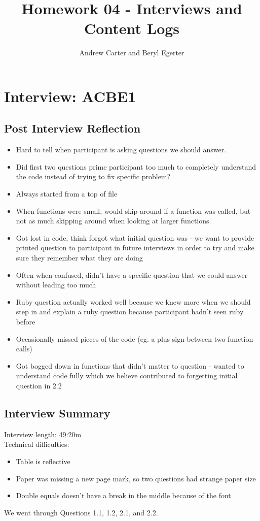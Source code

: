 \documentclass{article}
\title{Homework 04 - Interviews and Content Logs}
\author{Andrew Carter and Beryl Egerter}
\begin{document}
\maketitle
\section{Interview: ACBE1}
\subsection{Post Interview Reflection}
\begin{itemize}
  \item Hard to tell when participant is asking questions we should answer.
  \item Did first two questions prime participant too much to completely understand the code instead of trying to fix specific problem?
  \item Always started from a top of file
  \item When functions were small, would skip around if a function was called, but not as much skipping around when looking at larger functions.
  \item Got lost in code, think forgot what initial question was - we want to provide printed question to participant in future interviews in order to try and make sure they remember what they are doing
  \item Often when confused, didn't have a specific question that we could answer without leading too much
  \item Ruby question actually worked well because we knew more when we should step in and explain a ruby question because participant hadn't seen ruby before
  \item Occasionally missed pieces of the code (eg. a plus sign between two function calls)
  \item Got bogged down in functions that didn't matter to question - wanted to understand code fully which we believe contributed to forgetting initial question in 2.2
\end{itemize}
\subsection{Interview Summary}
Interview length: 49:20m \\
Technical difficulties: 
\begin{itemize}
  \item Table is reflective
  \item Paper was missing a new page mark, so two questions had strange paper size
  \item Double equals doesn't have a break in the middle because of the font
\end{itemize}
We went through Questions 1.1, 1.2, 2.1, and 2.2. 
\end{document}

